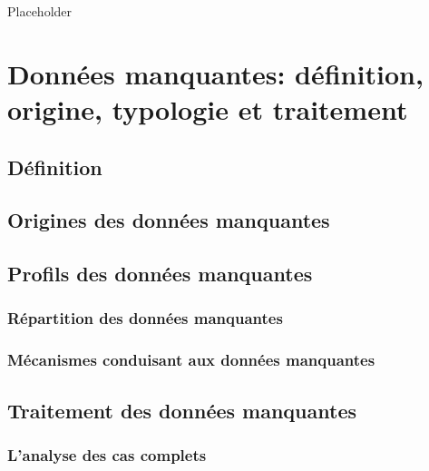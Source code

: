 \documentclass[]{book}
\begin{document}
Placeholder

\hypertarget{donnuxe9es-manquantes-duxe9finition-origine-typologie-et-traitement}{%
\section{Données manquantes: définition, origine, typologie et
traitement}\label{donnuxe9es-manquantes-duxe9finition-origine-typologie-et-traitement}}

\hypertarget{duxe9finition}{%
\subsection{Définition}\label{duxe9finition}}

\hypertarget{origines-des-donnuxe9es-manquantes}{%
\subsection{Origines des données
manquantes}\label{origines-des-donnuxe9es-manquantes}}

\hypertarget{profils-des-donnuxe9es-manquantes}{%
\subsection{Profils des données
manquantes}\label{profils-des-donnuxe9es-manquantes}}

\hypertarget{ruxe9partition-des-donnuxe9es-manquantes}{%
\subsubsection{Répartition des données
manquantes}\label{ruxe9partition-des-donnuxe9es-manquantes}}

\hypertarget{muxe9canismes-conduisant-aux-donnuxe9es-manquantes}{%
\subsubsection{Mécanismes conduisant aux données
manquantes}\label{muxe9canismes-conduisant-aux-donnuxe9es-manquantes}}

\hypertarget{traitement-des-donnuxe9es-manquantes}{%
\subsection{Traitement des données
manquantes}\label{traitement-des-donnuxe9es-manquantes}}

\hypertarget{lanalyse-des-cas-complets}{%
\subsubsection{L'analyse des cas
complets}\label{lanalyse-des-cas-complets}}
\end{document}
